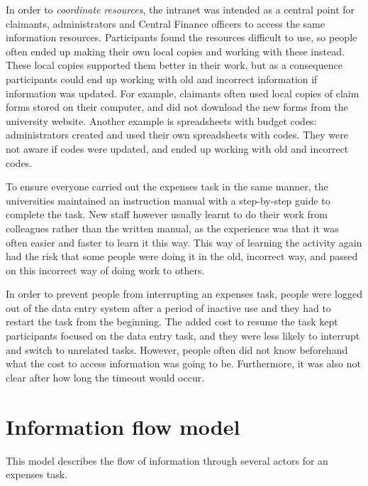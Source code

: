 In order to \textit{coordinate resources}, the intranet was intended as a central point for claimants, administrators and Central Finance officers to access the same information resources. Participants found the resources difficult to use, so people often ended up making their own local copies and working with these instead. These local copies supported them better in their work, but as a consequence participants could end up working with old and incorrect information if information was updated. For example, claimants often used local copies of claim forms stored on their computer, and did not download the new forms from the university website. Another example is spreadsheets with budget codes: administrators created and used their own spreadsheets with codes. They were not aware if codes were updated, and ended up working with old and incorrect codes. 

To ensure everyone carried out the expenses task in the same manner, the universities maintained an instruction manual with a step-by-step guide to complete the task. New staff however usually learnt to do their work from colleagues rather than the written manual, as the experience was that it was often easier and faster to learn it this way. This way of learning the activity again had the risk that some people were doing it in the old, incorrect way, and passed on this incorrect way of doing work to others.

In order to prevent people from interrupting an expenses task, people were logged out of the data entry system after a period of inactive use and they had to restart the task from the beginning. The added cost to resume the task kept participants focused on the data entry task, and they were less likely to interrupt and switch to unrelated tasks. However, people often did not know beforehand what the cost to access information was going to be. Furthermore, it was also not clear after how long the timeout would occur.

\section{Information flow model}
This model describes the flow of information through several actors for an expenses task.

